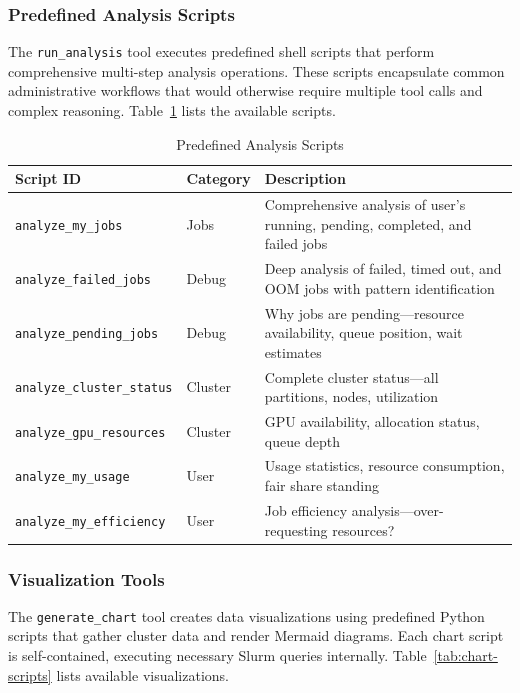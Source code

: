 \subsubsection{Predefined Analysis Scripts}

The \texttt{run\_analysis} tool executes predefined shell scripts that perform comprehensive multi-step analysis operations. These scripts encapsulate common administrative workflows that would otherwise require multiple tool calls and complex reasoning. Table~\ref{tab:analysis-scripts} lists the available scripts.

\begin{table}[H]
    \centering
    \caption{Predefined Analysis Scripts}
    \label{tab:analysis-scripts}
    \small
    \begin{tabular}{|l|l|p{6cm}|}
        \hline
        \textbf{Script ID} & \textbf{Category} & \textbf{Description} \\
        \hline
        \texttt{analyze\_my\_jobs} & Jobs & Comprehensive analysis of user's running, pending, completed, and failed jobs \\
        \texttt{analyze\_failed\_jobs} & Debug & Deep analysis of failed, timed out, and OOM jobs with pattern identification \\
        \texttt{analyze\_pending\_jobs} & Debug & Why jobs are pending---resource availability, queue position, wait estimates \\
        \texttt{analyze\_cluster\_status} & Cluster & Complete cluster status---all partitions, nodes, utilization \\
        \texttt{analyze\_gpu\_resources} & Cluster & GPU availability, allocation status, queue depth \\
        \texttt{analyze\_my\_usage} & User & Usage statistics, resource consumption, fair share standing \\
        \texttt{analyze\_my\_efficiency} & User & Job efficiency analysis---over-requesting resources? \\
        \hline
    \end{tabular}
\end{table}

\subsubsection{Visualization Tools}

The \texttt{generate\_chart} tool creates data visualizations using predefined Python scripts that gather cluster data and render Mermaid diagrams. Each chart script is self-contained, executing necessary Slurm queries internally. Table~\ref{tab:chart-scripts} lists available visualizations.

